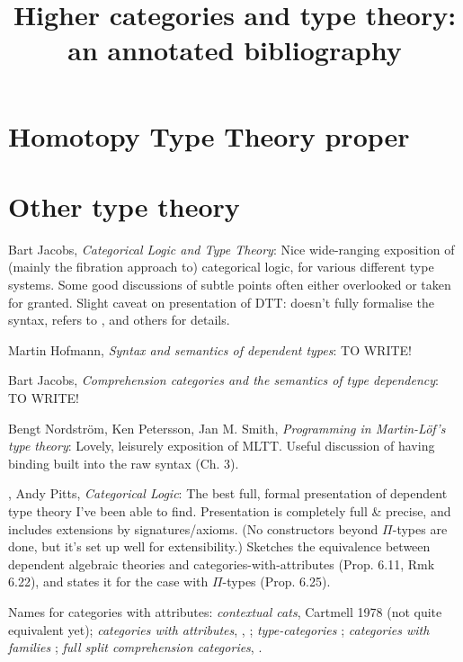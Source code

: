 \documentclass{article}
\begin{document}
\title{Higher categories and type theory: an annotated bibliography}

\section{Homotopy Type Theory proper}

\section{Other type theory}

\cite{jacobs:categorical-logic} Bart Jacobs, \emph{Categorical Logic and Type Theory}: Nice wide-ranging exposition of (mainly the fibration approach to) categorical logic, for various different type systems.  Some good discussions of subtle points often either overlooked or taken for granted.  Slight caveat on presentation of DTT: doesn't fully formalise the syntax, refers to \cite{pitts:categorical-logic}, \cite{hofmann:syntax-and-semantics} and others for details.

\cite{hofmann:syntax-and-semantics} Martin Hofmann, \emph{Syntax and semantics of dependent types}: TO WRITE!

\cite{jacobs:comprehension-categories} Bart Jacobs, \emph{Comprehension categories and the semantics of type dependency}: TO WRITE!

\cite{n-p-s:programming} Bengt Nordstr\"o{}m, Ken Petersson, Jan M. Smith, \emph{Programming in Martin-L\"o{}f's type theory}: Lovely, leisurely exposition of MLTT.  Useful discussion of having binding built into the raw syntax (Ch. 3).

\cite{pitts:categorical-logic}, Andy Pitts, \emph{Categorical Logic}: The best full, formal presentation of dependent type theory I've been able to find.  Presentation is completely full \& precise, and includes extensions by signatures/axioms.  (No constructors beyond $\Pi$-types are done, but it's set up well for extensibility.)  Sketches the equivalence between dependent algebraic theories and categories-with-attributes (Prop. 6.11, Rmk 6.22), and states it for the case with $\Pi$-types (Prop. 6.25).

Names for categories with attributes: \emph{contextual cats}, Cartmell 1978 (not quite equivalent yet); \emph{categories with attributes}, \cite{hofmann:lcccs}, \cite{hofmann:syntax-and-semantics}; \emph{type-categories} \cite{pitts:categorical-logic}; \emph{categories with families} \cite{dybjer:internal-type-theory}; \emph{full split comprehension categories}, \cite[4.10]{jacobs:comprehension-categories}.
\end{document}
